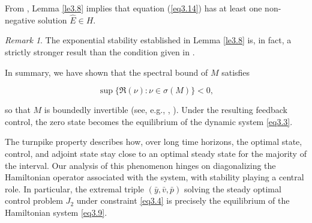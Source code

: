 \documentclass[10pt, a4]{amsart}
\theoremstyle{plain}
\theoremstyle{definition}
\theoremstyle{remark}
\newtheorem{remark}[lemma]{Remark}
\numberwithin{equation}{section}
\begin{document}
From \cite[Theorem 4.4, p. 241]{ref37}, Lemma \ref{le3.8} implies that equation (\ref{eq3.14}) has at least one non-negative solution \(\hat{E}\in H\).

\begin{remark}
 The exponential stability established in Lemma \ref{le3.8} is, in fact, a strictly stronger result than the condition given in \cite[Theorem 3.1(ii), p. 222]{ref37}.
\end{remark}

In summary, we have shown that the spectral bound of $M$ satisfies

$$
\sup\{\Re(\nu) : \nu\in\sigma(M)\} < 0,
$$

so that $M$ is boundedly invertible (see, e.g., \cite[Proposition 3.1]{ref63}, \cite[Theorem 3.1, p. 222]{ref37}). Under the resulting feedback control, the zero state becomes the equilibrium of the dynamic system \eqref{eq3.3}.

The turnpike property describes how, over long time horizons, the optimal state, control, and adjoint state stay close to an optimal steady state for the majority of the interval. Our analysis of this phenomenon hinges on diagonalizing the Hamiltonian operator associated with the system, with stability playing a central role. In particular, the extremal triple $(\bar{y}, \bar{v}, \bar{p})$ solving the steady optimal control problem $J_2$ under constraint \eqref{eq3.4} is precisely the equilibrium of the Hamiltonian system \eqref{eq3.9}.
\end{document}
